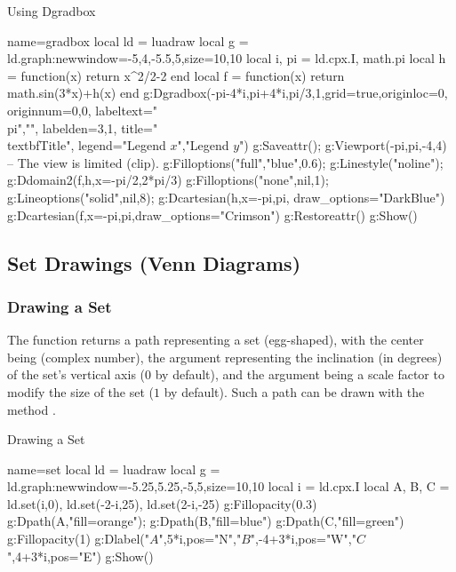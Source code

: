 \begin{demo}{Using Dgradbox}
\begin{luadraw}{name=gradbox}
local ld = luadraw
local g = ld.graph:new{window={-5,4,-5.5,5},size={10,10}}
local i, pi = ld.cpx.I, math.pi
local h = function(x) return x^2/2-2 end
local f = function(x) return math.sin(3*x)+h(x) end
g:Dgradbox({-pi-4*i,pi+4*i,pi/3,1},{grid=true,originloc=0, originnum={0,0}, labeltext={"\\pi",""},
labelden={3,1}, title="\\textbf{Title}", legend={"Legend $x$","Legend $y$"}})
g:Saveattr(); g:Viewport(-pi,pi,-4,4) -- The view is limited (clip).
g:Filloptions("full","blue",0.6); g:Linestyle("noline"); g:Ddomain2(f,h,{x={-pi/2,2*pi/3}})
g:Filloptions("none",nil,1); g:Lineoptions("solid",nil,8); g:Dcartesian(h,{x={-pi,pi}, draw_options="DarkBlue"})
g:Dcartesian(f,{x={-pi,pi},draw_options="Crimson"})
g:Restoreattr()
g:Show()
\end{luadraw}
\end{demo}

\subsection{Set Drawings (Venn Diagrams)}

\subsubsection{Drawing a Set}

The function  returns a path representing a set (egg-shaped), with the center being  (complex number), the argument  representing the inclination (in degrees) of the set's vertical axis ($0$ by default), and the argument  being a scale factor to modify the size of the set ($1$ by default). Such a path can be drawn with the method .

\begin{demo}{Drawing a Set}
\begin{luadraw}{name=set}
local ld = luadraw
local g = ld.graph:new{window={-5.25,5.25,-5,5},size={10,10}}
local i = ld.cpx.I
local A, B, C = ld.set(i,0), ld.set(-2-i,25), ld.set(2-i,-25)
g:Fillopacity(0.3)
g:Dpath(A,"fill=orange"); g:Dpath(B,"fill=blue")
g:Dpath(C,"fill=green")
g:Fillopacity(1)
g:Dlabel("$A$",5*i,{pos="N"},"$B$",-4+3*i,{pos="W"},"$C$",4+3*i,{pos="E"})
g:Show()
\end{luadraw}
\end{demo}

